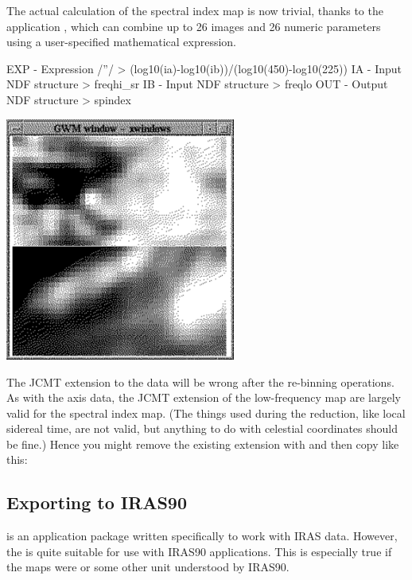 \documentclass[11pt,noabs]{starlink}
\begin{document}
   The actual calculation of the spectral index map is now trivial,
   thanks to the application
\texttt{},
   which can combine up to 26 images and 26 numeric parameters using a
   user-specified mathematical expression.

\begin{terminalv}
EXP - Expression /''/ > (log10(ia)-log10(ib))/(log10(450)-log10(225))
IA - Input NDF structure > freqhi_sr
IB - Input NDF structure > freqlo
OUT - Output NDF structure > spindex
\end{terminalv}

\begin{center}
\leavevmode\includegraphics[height=80mm]{sc1_spindex2}
\end{center}

   The JCMT extension to the data
   will be wrong after the re-binning operations. As with the axis data,
   the JCMT extension of the low-frequency map are largely valid
   for the spectral index map. (The things used during the reduction,
   like local sidereal time, are not valid, but anything to do with
   celestial coordinates should be fine.) Hence you might remove the
   existing extension with
\texttt{}
   and then copy like this:

\begin{terminalv}
\end{terminalv}

\subsection{\label{iras90}Exporting to IRAS90}

   is an application package written specifically to work with IRAS
   data. However, the
   is quite suitable for use
   with IRAS90 applications. This is especially true if the maps were
   or some other unit understood by IRAS90.
\end{document}
